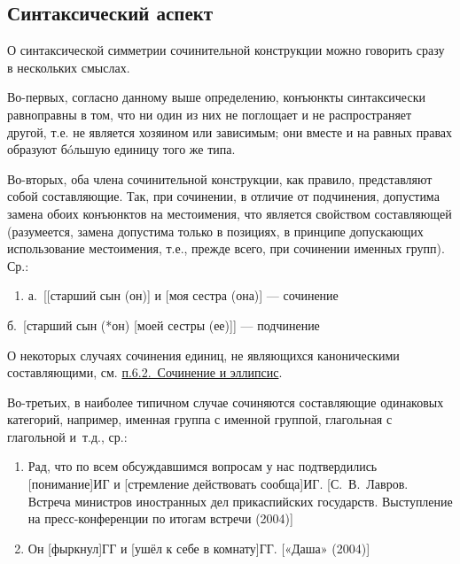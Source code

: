 \subsection{Синтаксический
аспект}\label{ux441ux438ux43dux442ux430ux43aux441ux438ux447ux435ux441ux43aux438ux439-ux430ux441ux43fux435ux43aux442}

О синтаксической симметрии сочинительной конструкции можно говорить
сразу в нескольких смыслах.

Во-первых, согласно данному выше определению, конъюнкты синтаксически
равноправны в том, что ни один из них не поглощает и не распространяет
другой, т.е. не является хозяином или зависимым; они вместе и на равных
правах образуют бóльшую единицу того же типа.

Во-вторых, оба члена сочинительной конструкции, как правило,
представляют собой составляющие. Так, при сочинении, в отличие от
подчинения, допустима замена обоих конъюнктов на местоимения, что
является свойством составляющей (разумеется, замена допустима только в
позициях, в принципе допускающих использование местоимения, т.е., прежде
всего, при сочинении именных групп). Ср.:

\begin{enumerate}
\def\labelenumi{(\arabic{enumi})}
\setcounter{enumi}{9}
\item
  а.~{[}{[}старший сын (он){]} и {[}моя сестра (она){]} --- сочинение
\end{enumerate}

б.~{[}старший сын (*он) {[}моей сестры (ее){]}{]} --- подчинение

О некоторых случаях сочинения единиц, не являющихся каноническими
составляющими, см. \underline{п.6.2.~Сочинение и эллипсис}.

Во-третьих, в наиболее типичном случае сочиняются составляющие
одинаковых категорий, например, именная группа с именной группой,
глагольная с глагольной и~т.д., ср.:

\begin{enumerate}
\def\labelenumi{(\arabic{enumi})}
\setcounter{enumi}{10}
\item
  Рад, что по всем обсуждавшимся вопросам у нас подтвердились
  {[}понимание{]}ИГ и {[}стремление действовать сообща{]}ИГ.
  {[}С.~В.~Лавров. Встреча министров иностранных дел прикаспийских
  государств. Выступление на пресс-конференции по итогам встречи
  (2004){]}
\item
  Он {[}фыркнул{]}ГГ и {[}ушёл к себе в комнату{]}ГГ. {[}«Даша»
  (2004){]}
\end{enumerate}

